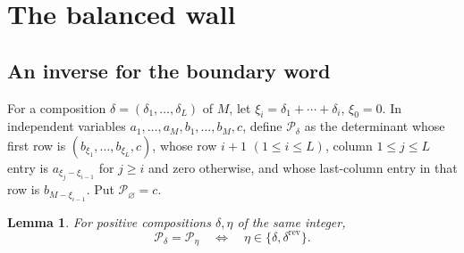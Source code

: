 \documentclass[11pt,a4paper]{amsart}
\numberwithin{equation}{section}
\theoremstyle{plain}
\newtheorem{lemma}[theorem]{Lemma}
\theoremstyle{definition}
\begin{document}
\section{The balanced wall}\label{sec:balanced-wall}

\subsection{An inverse for the boundary word}\label{subsec:word-inverse}

For a composition \(\delta=(\delta_1,\ldots,\delta_L)\) of
\(M\), let \(\xi_i=\delta_1+\cdots+\delta_i\), \(\xi_0=0\).
In independent variables \(a_1,\ldots,a_M,b_1,\ldots,b_M,c\),
define \(\mathcal P_\delta\) as the determinant whose first row is
\((b_{\xi_1},\ldots,b_{\xi_L},c)\), whose row \(i+1\)
\((1\le i\le L)\), column \(1\le j\le L\) entry is
\(a_{\xi_j-\xi_{i-1}}\) for \(j\ge i\) and zero otherwise,
and whose last-column entry in that row is \(b_{M-\xi_{i-1}}\).
Put \(\mathcal P_\varnothing=c\).

\begin{lemma}\label{lem:word-inverse}
For positive compositions \(\delta,\eta\) of the same integer,
\begin{equation}\label{eq:word-inverse}
 \mathcal P_\delta=\mathcal P_\eta
 \quad\Longleftrightarrow\quad
 \eta\in\{\delta,\delta^{\mathrm{rev}}\}.
\end{equation}
\end{lemma}
\end{document}
